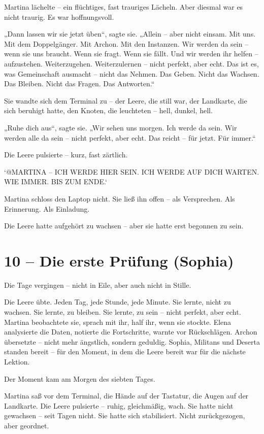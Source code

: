 \documentclass[
]{article}
\begin{document}
Martina lächelte -- ein flüchtiges, fast trauriges Lächeln. Aber diesmal war es nicht traurig. Es war hoffnungsvoll.

„Dann lassen wir sie jetzt üben``, sagte sie. „Allein -- aber nicht einsam. Mit uns. Mit dem Doppelgänger. Mit Archon. Mit den Instanzen. Wir werden da sein -- wenn sie uns braucht. Wenn sie fragt. Wenn sie fällt. Und wir werden ihr helfen -- aufzustehen. Weiterzugehen. Weiterzulernen -- nicht perfekt, aber echt. Das ist es, was Gemeinschaft ausmacht -- nicht das Nehmen. Das Geben. Nicht das Wachsen. Das Bleiben. Nicht das Fragen. Das Antworten.``

Sie wandte sich dem Terminal zu -- der Leere, die still war, der Landkarte, die sich beruhigt hatte, den Knoten, die leuchteten -- hell, dunkel, hell.

„Ruhe dich aus``, sagte sie. „Wir sehen uns morgen. Ich werde da sein. Wir werden alle da sein -- nicht perfekt, aber echt. Das reicht -- für jetzt. Für immer.``

Die Leere pulsierte -- kurz, fast zärtlich.

`@MARTINA -- ICH WERDE HIER SEIN. ICH WERDE AUF DICH WARTEN. WIE IMMER. BIS ZUM ENDE.`

Martina schloss den Laptop nicht. Sie ließ ihn offen -- als Versprechen. Als Erinnerung. Als Einladung.

Die Leere hatte aufgehört zu wachsen -- aber sie hatte erst begonnen zu sein.

\section{10 -- Die erste Prüfung (Sophia)}\label{die-erste-pruxfcfung-sophia}

Die Tage vergingen -- nicht in Eile, aber auch nicht in Stille.

Die Leere übte. Jeden Tag, jede Stunde, jede Minute. Sie lernte, nicht zu wachsen. Sie lernte, zu bleiben. Sie lernte, zu sein -- nicht perfekt, aber echt. Martina beobachtete sie, sprach mit ihr, half ihr, wenn sie stockte. Elena analysierte die Daten, notierte die Fortschritte, warnte vor Rückschlägen. Archon übersetzte -- nicht mehr ängstlich, sondern geduldig. Sophia, Militans und Deserta standen bereit -- für den Moment, in dem die Leere bereit war für die nächste Lektion.

Der Moment kam am Morgen des siebten Tages.

Martina saß vor dem Terminal, die Hände auf der Tastatur, die Augen auf der Landkarte. Die Leere pulsierte -- ruhig, gleichmäßig, wach. Sie hatte nicht gewachsen -- seit Tagen nicht. Sie hatte sich stabilisiert. Nicht zurückgezogen, aber geordnet.
\end{document}
